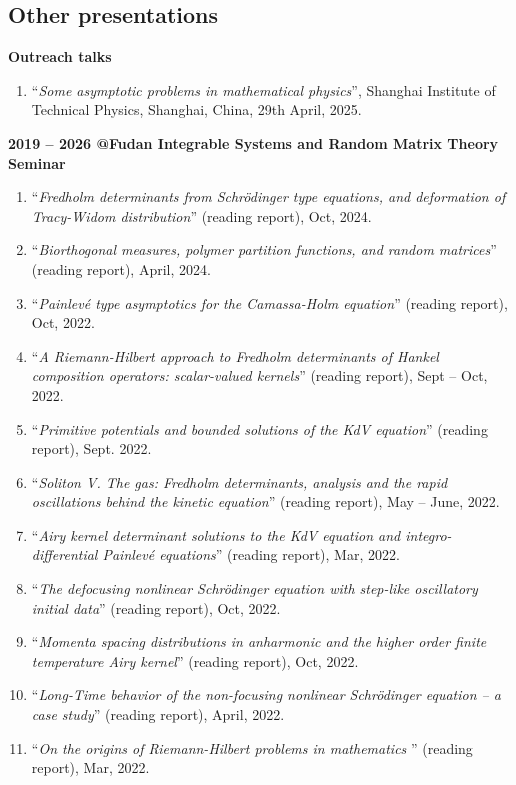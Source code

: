 \documentclass[margin]{res}
\begin{document}
\begin{resume}
\section{Other presentations}
\textbf{Outreach talks}
\begin{enumerate}[--]
\item ``{\sl Some asymptotic problems in mathematical physics}'', Shanghai Institute of Technical Physics, Shanghai, China, 29th April, 2025.
\end{enumerate}

\textbf{2019 -- 2026 @Fudan Integrable Systems and Random Matrix Theory Seminar }
\begin{enumerate}[--]
\item ``{\sl Fredholm determinants from Schr\"odinger type equations, and deformation of Tracy-Widom distribution}'' (reading report), Oct, 2024.
\item ``{\sl Biorthogonal measures, polymer partition functions, and random matrices}'' (reading report), April, 2024.
\item ``{\sl Painlev\'e type asymptotics for the Camassa-Holm equation}'' (reading report), Oct, 2022.
\item ``{\sl A Riemann-Hilbert approach to Fredholm determinants of Hankel composition operators: scalar-valued kernels}'' (reading report), Sept -- Oct, 2022.
\item ``{\sl Primitive potentials and bounded solutions of the KdV equation}'' (reading report), Sept. 2022.
\item ``{\sl Soliton V. The gas: Fredholm determinants, analysis and the rapid oscillations behind the kinetic equation}'' (reading report), May -- June, 2022.
\item ``{\sl Airy kernel determinant solutions to the KdV equation and integro-differential Painlev\'e equations}'' (reading report), Mar, 2022.
\item ``{\sl The defocusing nonlinear Schr\"odinger equation with step-like oscillatory initial data}'' (reading report), Oct, 2022.
\item ``{\sl Momenta spacing distributions in anharmonic and the higher order finite temperature Airy kernel}'' (reading report), Oct, 2022.
\item ``{\sl Long-Time behavior of the non-focusing nonlinear Schr\"odinger equation -- a case study}'' (reading report), April, 2022.
\item ``{\sl On the origins of Riemann-Hilbert problems in mathematics} '' (reading report), Mar, 2022.
\end{enumerate}



\end{resume}
\end{document}

